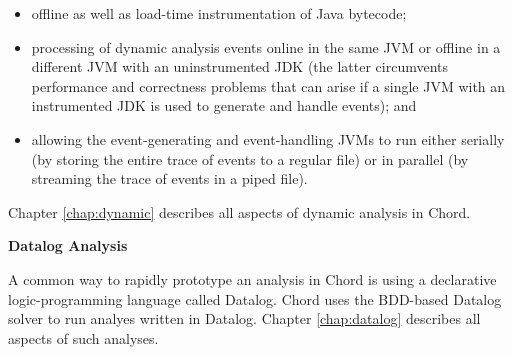 \begin{itemize}
\item
offline as well as load-time instrumentation of Java bytecode;
\item
processing of dynamic analysis events online in the same JVM or offline in a
different JVM with an uninstrumented JDK (the latter circumvents performance and
correctness problems that can arise if a single JVM with an instrumented JDK is
used to generate and handle events); and
\item
allowing the event-generating and event-handling JVMs to run either serially
(by storing the entire trace of events to a regular file) or in parallel (by
streaming the trace of events in a piped file).
\end{itemize}

Chapter \ref{chap:dynamic} describes all aspects of dynamic analysis in Chord.

{\bf Datalog Analysis}

A common way to rapidly prototype an analysis in Chord is using a declarative
logic-programming language called Datalog.  Chord uses the BDD-based Datalog
solver  to run analyes written
in Datalog.  Chapter \ref{chap:datalog} describes all aspects of such analyses.

